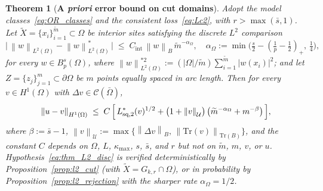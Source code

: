 \documentclass[11pt]{article}
\newtheorem{theorem}{Theorem}
\newcommand{\Omg}{\Omega}
\newcommand{\bOmg}{\partial\Omega}
\newcommand{\C}{\mathcal{C}}
\newcommand{\norm}[1]{\left\|#1\right\|}
\newcommand{\mtil}{\widetilde{m}}
\begin{document}
\begin{theorem}[\textbf{A\emph{ priori} error bound on cut
domains}]\label{thm:apriori}
Adopt the model classes~\eqref{eq:OR_classes} and the consistent
loss~\eqref{eq:Lc2}, with $r > \max(\bar{s}, 1)$. Let
$\tilde{X} = \{x_i\}_{i=1}^{\mtil}\subset\Omg$ be interior sites
satisfying the discrete $L^2$ comparison
\begin{equation}\label{eq:thm_L2_disc}
  \bigl|\,\norm{w}_{L^2(\Omg)} - \norm{w}^*_{L^2(\Omg)}\,\bigr|
  \;\le\; C_{\mathrm{int}}\,\norm{w}_B\,\mtil^{-\alpha_\Omega},
  \quad
  \alpha_\Omega := \min\!\bigl(\tfrac{s}{2}
    -(\tfrac{1}{p}-\tfrac{1}{2})_+,\,\tfrac{1}{4}\bigr),
\end{equation}
for every $w \in B^s_p(\Omega)$, where
$\norm{w}^{*2}_{L^2(\Omg)} := (|\Omg|/\mtil)\sum_{i=1}^{\mtil}|w(x_i)|^2$;
and let $Z = \{z_j\}_{j=1}^m \subset \bOmg$ be $m$ points equally
spaced in arc length. Then for every $v \in H^1(\Omg)$ with
$\Delta v \in \C(\bar\Omg)$,
\begin{equation}\label{eq:apriori_bound}
  \norm{u - v}_{H^1(\Omg)}
  \;\le\; C\,\Bigl[\, L^*_{\mathrm{sq},2}(v)^{1/2}
    + \bigl(1 + \norm{v}_{\mathcal{U}}\bigr)\,
      \bigl(\mtil^{-\alpha_\Omega} + m^{-\beta}\bigr)\,\Bigr],
\end{equation}
where $\beta := \bar{s} - 1$,
$\norm{v}_{\mathcal{U}} := \max\bigl\{\norm{\Delta v}_B,\,
\norm{\mathrm{Tr}(v)}_{\mathrm{Tr}(B)}\bigr\}$, and the constant $C$
depends on $\Omg$, $L$, $\kappa_{\max}$, $s$, $\bar{s}$, and $r$ but
not on $\mtil$, $m$, $v$, or $u$.
Hypothesis~\eqref{eq:thm_L2_disc} is verified deterministically by
Proposition~\ref{prop:l2_cut} (with $\tilde X = G_{k,r}\cap\Omg$), or
in probability by Proposition~\ref{prop:l2_rejection} with the
sharper rate $\alpha_\Omega = 1/2$.
\end{theorem}
 
\end{document}

